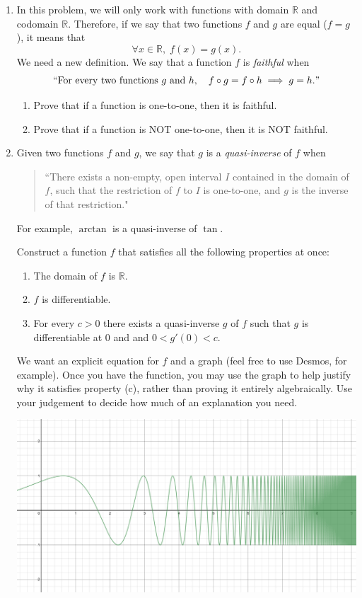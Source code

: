 \documentclass[12pt]{exam}
\newcommand{\vv}{\vspace{.1cm}}
\newcommand{\R}{\mathbb{R}}
\begin{document}
\begin{enumerate}

\item In this problem, we will only work with functions with domain $\mathbb{R}$ and codomain $\R$.   Therefore, if we say that two functions $f$ and $g$ are equal ($f=g$), it means that 
	$$
		\forall x \in \R, \; f(x)  = g(x) .
	$$
We need a new definition.  We say that a function $f$ is \emph{faithful} when
	\begin{equation*}
		``\mbox{For every two functions } g \mbox{ and } h, \quad f \circ g = f \circ h \implies g = h."
	\end{equation*}
	\begin{enumerate}
		\item  Prove that if a function is one-to-one, then it is faithful.
		\item  Prove that if a function is NOT one-to-one, then it is NOT faithful.
	\end{enumerate}

\vv

\newpage

\item   Given two functions $f$ and $g$, we say that $g$ is a \emph{quasi-inverse} of $f$ when
	\begin{quote}
	``There exists a non-empty, open interval $I$ contained in the domain of $f$, such that the restriction of $f$ to $I$ is one-to-one, and $g$ is the inverse of that restriction."
	\end{quote}
For example, $\arctan$ is a quasi-inverse of $\tan$.

Construct a function $f$ that satisfies all the following properties at once:
	\begin{enumerate}
		\item  The domain of $f$ is $\R$.
		\item  $f$ is differentiable.
		\item  \label{long} For every $c>0$ there exists a quasi-inverse $g$ of $f$ such that $g$ is differentiable at $0$ and and $0 < g'(0) < c$.
	\end{enumerate}

We want an explicit equation for $f$ and a graph (feel free to use Desmos, for example).  Once you have the function, you may use the graph to help justify why it satisfies property (c), rather than proving it entirely algebraically.  Use your judgement to decide how much of an explanation you need.

\includegraphics[scale=0.4]{a4}


\end{enumerate}
\end{document}
